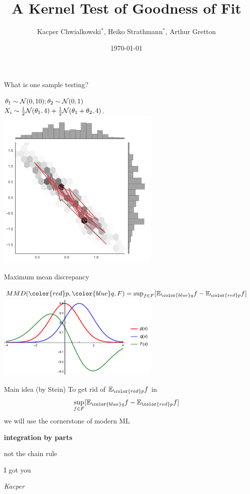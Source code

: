 \documentclass{beamer}
\title{ A Kernel Test of Goodness of Fit}
\date{\today}
\author{Kacper Chwialkowski$^*$, Heiko Strathmann$^*$, Arthur Gretton}
\institute{}
\begin{document}
\frame{\titlepage}
 \begin{frame}{What is one sample testing?}
 \begin{center}
$\theta_{1}\sim{\cal N}(0,10);\theta_{2}\sim{\cal N}(0,1)$\\
$ X_{i}\sim\frac{1}{2}{\cal N}(\theta_{1},4)+\frac{1}{2}{\cal N}(\theta_{1}+\theta_{2},4) $.
 \includegraphics[width=0.6\textwidth]{./img/sgld_sample_wth_trace.pdf} 
 \end{center}
 \end{frame}
 
 \begin{frame}{Maximum mean discrepancy}
 \begin{center}
$MMD({\color{red} p},{ \color{blue} q},F) = \sup_{ f\in F} [\ev_{{ \color{blue} q}}f - \ev_{{\color{red} p}} f]  $\\
\vspace{0.5cm}
 \includegraphics[width=0.6\textwidth]{./img/mmd.pdf} 
 \end{center}
 \end{frame} 
 
 
 
 \begin{frame}{Main idea (by Stein)}
To get rid of $\ev_{{\color{red} p}}f$  in $$ \sup_{f \in F} [\ev_{{ \color{blue} q}}f - \ev_{{\color{red} p}} f ] $$we will use the cornerstone of modern ML

\pause
\textbf{integration by parts}

\pause 
not the chain rule

\pause
I got you

\pause 
\begin{flushright}
\small \textit{Kacper} 
\end{flushright}



\end{frame} 
\end{document}
